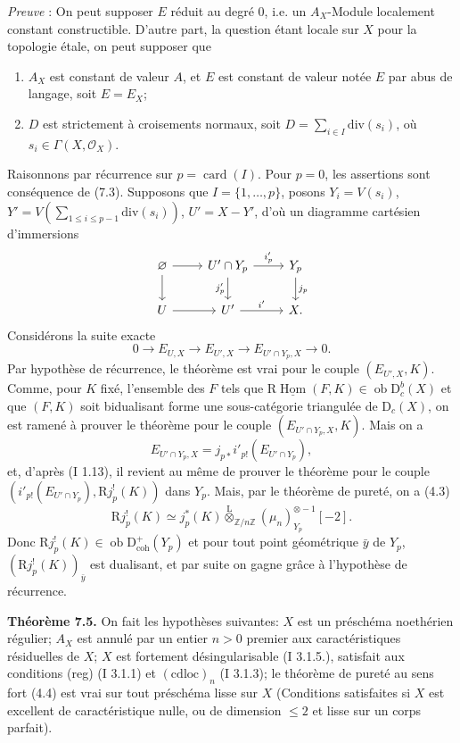 \documentclass[11pt]{article}
\DeclareMathOperator{\Hom}{Hom}
\newcommand{\R}{\mathrm{R}}\newcommand{\RHomCore}{\mathrm{RHom}}
\newcommand{\D}{\mathrm{D}}
\newcommand{\Z}{\mathbb{Z}}
\newcommand{\ob}{\operatorname{ob}}
\providecommand{\Hom}{\operatorname{Hom}}
\providecommand{\ob}{\operatorname{ob}}
\providecommand{\R}{\mathrm R}
\providecommand{\Z}{\mathbb Z}
\providecommand{\Hom}{\operatorname{Hom}}
\begin{document}
\emph{Preuve} : On peut supposer $E$ réduit au degré $0$, i.e. un $A_X$-Module localement constant constructible. D'autre part, la question étant locale sur $X$ pour la topologie étale, on peut supposer que
\begin{enumerate}[label=(\alph*)]
\item $A_X$ est constant de valeur $A$, et $E$ est constant de valeur notée $E$ par abus de langage, soit $E=E_X$;
\item $D$ est strictement à croisements normaux, soit $D=\sum_{i\in I}\mathrm{div}(s_i)$, où $s_i\in\Gamma(X,\mathcal{O}_X)$.
\end{enumerate}
Raisonnons par récurrence sur $p=\operatorname{card}(I)$. Pour $p=0$, les assertions sont conséquence de (7.3). Supposons que $I=\{1,\ldots,p\}$, posons $Y_i=V(s_i)$, $Y'=V(\sum_{1\leq i\leq p-1}\mathrm{div}(s_i))$, $U'=X-Y'$, d'où un diagramme cartésien d'immersions
\[
\begin{tikzcd}
\varnothing \arrow[r] \arrow[d] & U'\cap Y_p \arrow[r,"i'_p"] \arrow[d,"j'_p"'] & Y_p \arrow[d,"j_p"]\\
U \arrow[r] & U' \arrow[r,"i'"] & X.
\end{tikzcd}
\]
Considérons la suite exacte
\[
        0\longrightarrow E_{U,X}\longrightarrow E_{U',X}\longrightarrow E_{U'\cap Y_p,X}\longrightarrow0.
\]
Par hypothèse de
récurrence, le théorème est vrai pour le couple $(E_{U',X},K)$. Comme, pour $K$ fixé, l'ensemble des $F$ tels que $\R\underline{\Hom}(F,K)\in\ob\D_c^b(X)$ et que $(F,K)$ soit bidualisant forme une sous-catégorie triangulée de $\D_c(X)$, on est ramené à prouver le théorème pour le couple $(E_{U'\cap Y_p,X},K)$. Mais on a
\[
        E_{U'\cap Y_p,X}=j_{p*}i'_{p!}(E_{U'\cap Y_p}),
\]
et, d'après (I 1.13), il revient au même de prouver le théorème pour le couple $(i'_{p!}(E_{U'\cap Y_p}),\R j_p^!(K))$ dans $Y_p$. Mais, par le théorème de pureté, on a (4.3)
\[
        \R j_p^!(K)\simeq j_p^*(K)\overset{\mathrm{L}}{\otimes}_{\Z/n\Z}(\mu_n)_{Y_p}^{\otimes -1}[-2].
\]
Donc $\R j_p^!(K)\in\ob\D^{+}_{\mathrm{coh}}(Y_p)$ et pour tout point géométrique $\bar{y}$ de $Y_p$, $(\R j_p^!(K))_{\bar{y}}$ est dualisant, et par suite on gagne grâce à l'hypothèse de récurrence.

\textbf{Théorème 7.5.} On fait les hypothèses suivantes: $X$ est un préschéma noethérien régulier; $A_X$ est annulé par un entier $n>0$ premier aux caractéristiques résiduelles de $X$; $X$ est fortement désingularisable (I 3.1.5.), satisfait aux conditions (reg) (I 3.1.1) et $(\mathrm{cdloc})_n$ (I 3.1.3); le théorème de pureté au sens fort (4.4) est vrai sur tout préschéma lisse sur $X$ (Conditions satisfaites si $X$ est excellent de caractéristique nulle, ou de dimension $\leq2$ et lisse sur un corps parfait).
\end{document}
